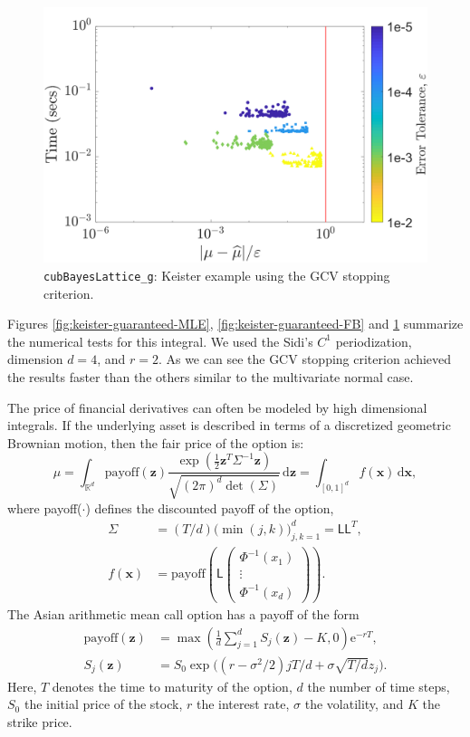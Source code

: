 \documentclass{iitthesis}          %
\newcommand{\bm}[1]{\boldsymbol{#1}}
\newcommand{\mSigma}{\mathsf{\Sigma}}
\newcommand{\dif}[1]{\text{d}{#1}}
\newcommand{\reals}{\mathbb{R}}
\newcommand{\vx}{\bm{x}}
\newcommand{\dvx}{\dif{\bm{x}}}
\newcommand{\vz}{\bm{z}}
\newcommand{\dvz}{\dif{\bm{z}}}
\newcommand{\mL}{\mathsf{L}}
\newcommand{\me}{\mathrm{e}}
\newcommand{\code}[1]{\texttt{#1}}
\begin{document}
\begin{figure}
	\centering
	\includegraphics[width=0.95\linewidth]{"Keister_guaranteed_time_GCV_C1sin_d4_r2_2018-Sep-6"}
	\caption[Keister guaranteed:GCV]{\code{cubBayesLattice\_g}: Keister example using the GCV stopping criterion.}
	\label{fig:keister-guaranteed-GCV}
\end{figure}

Figures \ref{fig:keister-guaranteed-MLE}, \ref{fig:keister-guaranteed-FB} and \ref{fig:keister-guaranteed-GCV} summarize the numerical tests for this integral.  We used the Sidi's $C^1$ periodization, dimension $d=4$, and $r=2$. 
As we can see the GCV stopping criterion achieved the results faster than the others similar to the multivariate normal case.

\label{sec:cubBayesLattice_option_pricing_example}
The price of financial derivatives can often be modeled by high dimensional integrals. If the underlying asset is described in terms of a discretized geometric Brownian motion, then the fair price of the option is:
\begin{equation*}
\mu = \int_{\reals^d} \text{payoff}(\vz) \frac{\exp(\frac 12 \vz^T\mSigma^{-1}\vz)}{\sqrt{(2\pi)^d \det(\mSigma)}} \, \dvz = \int_{[0,1]^d} f(\vx) \, \dvx,
\end{equation*} 
where {payoff($\cdot$)} defines the discounted payoff of the option,
\begin{align*}
\mSigma &= (T/d) \bigl(\min(j,k) \bigr)_{j,k=1}^d = \mL \mL^T,\\
f(\vx) &= \text{payoff} \left(\mL 
\begin{pmatrix}
\Phi^{-1}(x_1) \\ \vdots \\ \Phi^{-1}(x_d)
\end{pmatrix} \right).
\end{align*}
The Asian arithmetic mean call option has a payoff of the form
\begin{align*}
\text{payoff}(\vz) &= \max\left( \frac 1d  \sum_{j=1}^d S_j(\vz) - K, 0 \right) \me^{-r T}, \\
S_j(\vz) &= S_0 \exp\bigl((r-\sigma^2/2)jT/d + \sigma \sqrt{T/d} z_j \bigr).
\end{align*}
Here, $T$ denotes the time to maturity of the option, $d$ the number of time steps, $S_0$ the initial price of the stock, $r$ the interest rate, $\sigma$ the volatility, and $K$ the strike price.  
\end{document}
